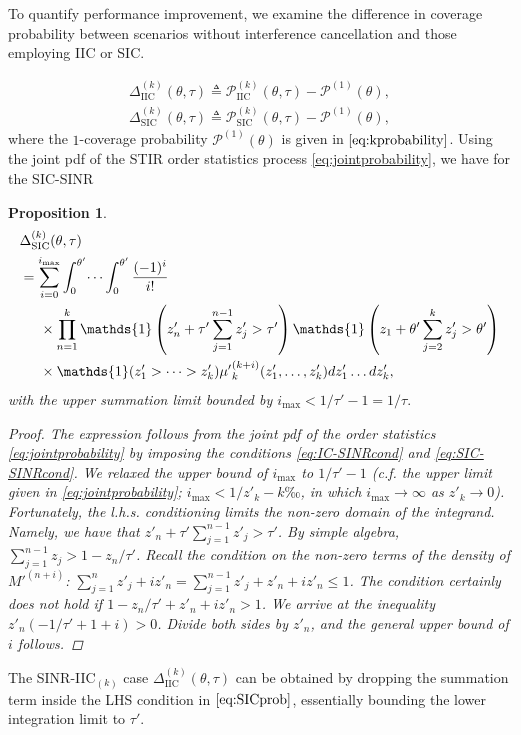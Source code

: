 \documentclass[lettersize,journal]{IEEEtran}
\newtheorem{prop}[theorem]{Proposition}
\begin{document}
To quantify performance improvement, we examine the difference in coverage probability between scenarios without interference cancellation and those employing IIC or SIC.

\begin{align}
  \Delta^{(k)}_{\text{IIC}}(\theta,\tau) \triangleq \mathcal{P}^{(k)}_{\text{IIC}}(\theta,\tau)- \mathcal{P}^{(1)}(\theta),\nonumber\\
  \Delta^{(k)}_{\text{SIC}}(\theta,\tau) \triangleq \mathcal{P}^{(k)}_{\text{SIC}}(\theta,\tau)- \mathcal{P}^{(1)}(\theta),
\end{align}
where the $1$-coverage probability  $\mathcal{P}^{(1)}(\theta)$ is given in $\eqref{eq:kprobability}$. Using the joint pdf of the STIR order statistics process \eqref{eq:jointprobability}, we have for the SIC-SINR
\begin{prop}
  \begin{align}
    \label{eq:SICprob}
    & \Delta^{(k)}_{\text{SIC}}(\theta,\tau) \nonumber\\
    &=\sum^{i_{\text{max}}}_{i=0} \int_{0}^{\theta'} \dots \int_{0}^{\theta'}\frac{(-1)^i}{i!}\nonumber \\
    & \hspace{0.5cm}\times \prod_{n=1}^k\mathds{1}\left( z'_n+ \tau'\sum_{j=1}^{n-1} z'_j>\tau' \right)  \mathds{1}\left(z_1+  \theta'\sum_{j=2}^k z'_j>\theta' \right) \nonumber \\
    &\hspace{0.5cm} \times \mathds{1}(z'_1>\dots>z'_k){\mu'}_k^{(k+i)}(z'_1,\dots,z'_k) d z'_1 \dots d z'_k,
  \end{align}
  with the upper summation limit bounded by $i_{\text{max}} < 1/\tau'-1=1/\tau.$ 
  \begin{proof}
    The expression follows from the joint pdf of the order statistics \eqref{eq:jointprobability} by imposing the conditions \eqref{eq:IC-SINRcond} and \eqref{eq:SIC-SINRcond}. We relaxed the upper bound of  $i_{\text{max}}$ to $1/\tau'-1$ (c.f. the upper limit given in \eqref{eq:jointprobability}; $i_{\text{max}} < 1/z'_{k}-k‰$, in which $i_{\text{max}} \rightarrow \infty$ as $z'_k \rightarrow 0$). Fortunately, the l.h.s. conditioning limits the non-zero domain of the integrand. Namely, we have that $z'_{n}+\tau'\sum_{j=1}^{n-1}z'_{j}>\tau'$. By simple algebra, $\sum_{j=1}^{n-1}z_{j}> 1-z_{n}/\tau'$. Recall the condition on the non-zero terms of the density of $M'^{(n+i)}$:  $\sum_{j=1}^n z'_{j}+i z'_{n} =\sum_{j=1}^{n-1}z'_{j} +z'_{n}+i z'_{n}  \leq 1$. The condition certainly does \textit{not} hold if $1-z_{n}/\tau'+ z'_{n}+i z'_{n}>1$. We arrive at the inequality $z'_{n} \left(-1/\tau' + 1 +i \right)>0$. Divide both sides by $z'_{n}$, and the general upper bound of $i$ follows.

    


  \end{proof}
\end{prop}
The SINR-IIC$_{(k)}$ case $\Delta^{(k)}_{\text{IIC}}(\theta,\tau)$ can be obtained by dropping the summation term inside the LHS condition in $\eqref{eq:SICprob}$, essentially bounding the lower integration limit to $\tau'$.
\end{document}
